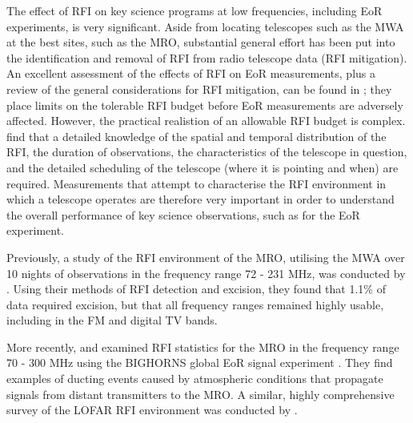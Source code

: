 The effect of RFI on key science programs at low frequencies, including EoR experiments, is very significant.  Aside from locating telescopes such as the MWA at the best sites, such as the MRO, substantial general effort has been put into the identification and removal of RFI from radio telescope data (RFI mitigation).  An excellent assessment of the effects of RFI on EoR measurements, plus a review of the general considerations for RFI mitigation, can be found in \citet{2020arXiv200407819W}; they place limits on the tolerable RFI budget before EoR measurements are adversely affected.  
However, the practical realistion of an allowable RFI budget is complex.  \citet{2020arXiv200407819W} find that a detailed knowledge of the spatial and temporal distribution of the RFI, the duration of observations, the characteristics of the telescope in question, and the detailed scheduling of the telescope (where it is pointing and when) are required.  Measurements that attempt to characterise the RFI environment in which a telescope operates are therefore very important in order to understand the overall performance of key science observations, such as for the EoR experiment.

Previously, a study of the RFI environment of the MRO, utilising the MWA over 10 nights of observations in the frequency range 72 - 231 MHz, was conducted by \citet{2015PASA...32....8O}.  Using their methods of RFI detection and excision, they found that 1.1\% of data required excision, but that all frequency ranges remained highly usable, including in the FM and digital TV bands.

More recently, \citet{2016arXiv161004696S} and \citet{2017rfi..confE...1S} examined RFI statistics for the MRO in the frequency range 70 - 300 MHz using the BIGHORNS global EoR signal experiment \citep{2015PASA...32....4S}.  They find examples of ducting events caused by atmospheric conditions that propagate signals from distant transmitters to the MRO.  A similar, highly comprehensive survey of the LOFAR RFI environment was conducted by \citet{2013A&A...549A..11O}.

